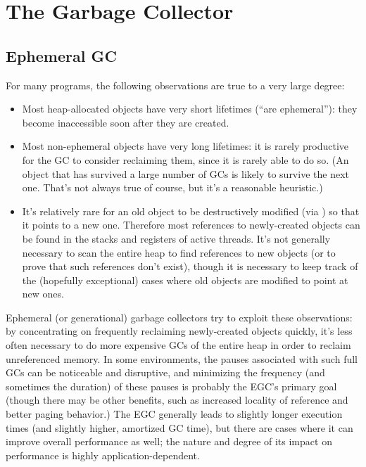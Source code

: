 \chapter{The Garbage Collector}

\section{Ephemeral GC}

For many programs, the following observations are true to a very large
degree:

\begin{itemize}
\item
  Most heap-allocated objects have very short lifetimes (``are
  ephemeral''): they become inaccessible soon after they are created.

\item
  Most non-ephemeral objects have very long lifetimes: it is rarely
  productive for the GC to consider reclaiming them, since it is rarely
  able to do so. (An object that has survived a large number of GCs is
  likely to survive the next one. That's not always true of course,
  but it's a reasonable heuristic.)

\item
  It's relatively rare for an old object to be destructively modified
  (via ) so that it points to a new one. Therefore most
  references to newly-created objects can be found in the stacks and
  registers of active threads. It's not generally necessary to scan
  the entire heap to find references to new objects (or to prove that
  such references don't exist), though it is necessary to keep track
  of the (hopefully exceptional) cases where old objects are modified
  to point at new ones.
\end{itemize}

Ephemeral (or generational) garbage collectors try to exploit these
observations: by concentrating on frequently reclaiming newly-created
objects quickly, it's less often necessary to do more expensive GCs of
the entire heap in order to reclaim unreferenced memory.  In some
environments, the pauses associated with such full GCs can be
noticeable and disruptive, and minimizing the frequency (and sometimes
the duration) of these pauses is probably the EGC's primary goal
(though there may be other benefits, such as increased locality of
reference and better paging behavior.) The EGC generally leads to
slightly longer execution times (and slightly higher, amortized GC
time), but there are cases where it can improve overall performance as
well; the nature and degree of its impact on performance is highly
application-dependent.

